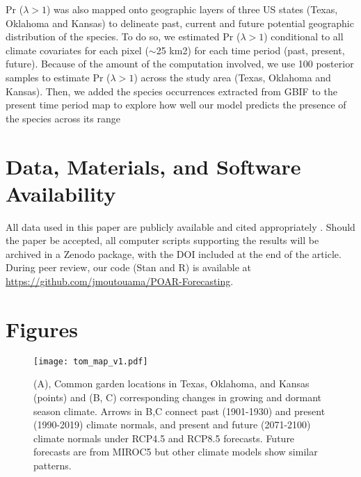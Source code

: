 \documentclass[9pt,twocolumn,twoside,lineno]{pnas-new}
\newcommand{\tom}[2]{{\color{red}{#1}}\footnote{\textit{\color{red}{#2}}}}
\begin{document}
Pr ($\lambda > 1$) was also mapped onto geographic layers of three US states (Texas, Oklahoma and Kansas) to delineate past, current and future potential geographic distribution of the species.
To do so, we estimated Pr ($\lambda > 1$) conditional to all climate covariates for each pixel ($\sim$25 km2) for each time period (past, present, future).
Because of the amount of the computation involved, we use 100 posterior samples to estimate Pr ($\lambda > 1$) across the study area (Texas, Oklahoma and Kansas).
Then, we added the species occurrences extracted from GBIF to the present time period map to explore how well our model predicts the presence of the species across its range


\showmatmethods{} %

\section*{Data, Materials, and Software Availability}
All data used in this paper are  publicly available and cited appropriately \citep{dryaddata}. 
Should the paper be accepted, all computer scripts supporting the results will be archived in a Zenodo package, with the DOI included at the end of the article. 
During peer review, our code (Stan and R) is available at \url{https://github.com/jmoutouama/POAR-Forecasting}. 


\showacknow{} %



\clearpage
\onecolumn
\section*{Figures}
\begin{figure}[H]
\centering
\texttt{[image: tom\_map\_v1.pdf]}
\caption{(A), Common garden locations in Texas, Oklahoma, and Kansas (points) and (B, C) corresponding changes in growing and dormant season climate. Arrows in B,C connect past (1901-1930) and present (1990-2019) climate normals, and present and future (2071-2100) climate normals under RCP4.5 and RCP8.5 forecasts. Future forecasts are from MIROC5 but other climate models show similar patterns.
			}
\label{fig:study_design}
\end{figure}
\clearpage
\end{document}
